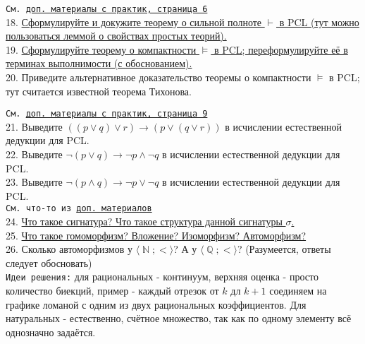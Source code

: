 \documentclass[a4paper,100pt]{article}
\theoremstyle{indented}
\theoremstyle{definition}
\theoremstyle{remark}
\DeclareMathOperator{\ra}{\rightarrow}
\DeclareMathOperator{\NN}{\mathbb{N}}
\DeclareMathOperator{\QQ}{\mathbb{Q}}
\begin{document}
\texttt{См. \href{http://www.mi-ras.ru/~speranski/courses/logic-1-2021-spring/slides-more_pcl.pdf}{доп. материалы с практик, страница 6}} \\

18. \hyperlink{b18}{Сформулируйте и докужите теорему о сильной полноте $\vdash$ в PCL (тут можно пользоваться леммой о свойствах простых теорий).} \\

19. \hyperlink{b19}{Сформулируйте теорему о компактности $\vDash$ в PCL; переформулируйте её в терминах выполнимости (с обоснованием).} \\ 

20. %
{Приведите альтернативное доказательство теоремы о компактности $\vDash$ в PCL; тут считается известной теорема Тихонова.} \ 

\texttt{См. \href{http://www.mi-ras.ru/~speranski/courses/logic-1-2021-spring/slides-more_pcl.pdf}{доп. материалы с практик, страница 9}} \\ 

21. %
{Выведите $((p \vee q) \vee r) \ra (p \vee (q \vee r))$ в исчислении естественной дедукции для PCL.} \\ 

22. %
{Выведите $\neg(p \vee q)\ra \neg p \wedge \neg q$ в исчислении естественной дедукции для PCL.} \\ 

23. %
{Выведите $\neg(p \wedge q)\ra \neg p \vee \neg q$ в исчислении естественной дедукции для PCL.} \\ 

\texttt{См. что-то из \href{http://www.mi-ras.ru/~speranski/courses/logic-1-2021-spring/slides-natural_deduction.pdf}{доп. материалов}} \\ 

24. \hyperlink{b24}{Что такое сигнатура? Что такое структура данной сигнатуры $\sigma$.} \\ 

25. \hyperlink{b25}{Что такое гомоморфизм? Вложение? Изоморфизм? Автоморфизм?} \\

26. %
{Сколько автоморфизмов у $\langle \NN; < \rangle$? А у $\langle \QQ; <\rangle$? (Разумеется, ответы следует обосновать)} \\

\texttt{Идеи решения:} для рациональных - континуум, верхняя оценка - просто количество биекций, пример - каждый отрезок от $k$ дл $k+1$ соединяем на графике ломаной с одним из двух рациональных коэффициентов. Для натуральных - естественно, счётное множество, так как по одному элементу всё однозначно задаётся. \\ 
\end{document}
